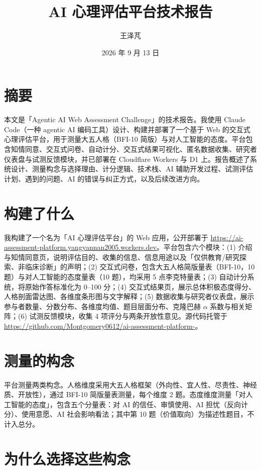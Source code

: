 \documentclass[11pt,a4paper]{ctexart}
\title{\bfseries AI 心理评估平台技术报告}
\author{王泽芃}
\date{2026 年 9 月 13 日}
\begin{document}
\maketitle

\section*{摘要}

本文是「Agentic AI Web Assessment Challenge」的技术报告。我使用 Claude Code（一种 agentic AI 编码工具）设计、构建并部署了一个基于 Web 的交互式心理评估平台，用于测量大五人格（BFI-10 简版）与对人工智能的态度。平台包含知情同意、交互式问卷、自动计分、交互式结果可视化、匿名数据收集、研究者仪表盘与试测反馈模块，并已部署在 Cloudflare Workers 与 D1 上。报告概述了系统设计、测量构念与选择理由、计分逻辑、技术栈、AI 辅助开发过程、试测评估计划、遇到的问题、AI 的错误与纠正方式，以及后续改进方向。

\section{构建了什么}

我构建了一个名为「AI 心理评估平台」的 Web 应用，公开部署于 \url{https://ai-assessment-platform.yangyannan2005.workers.dev}。平台包含六个模块：(1) 介绍与知情同意页，说明评估目的、收集的信息、信息用途以及「仅供教育/研究探索、非临床诊断」的声明；(2) 交互式问卷，包含大五人格简版量表（BFI-10，10 题）与对人工智能的态度量表（10 题），均采用 5 点李克特量表；(3) 自动计分系统，将原始作答标准化为 0--100 分；(4) 交互式结果页，展示总体积极态度得分、人格剖面雷达图、各维度条形图与文字解释；(5) 数据收集与研究者仪表盘，展示参与者数量、分数分布、各维度均值、题目层面分布、克隆巴赫 $\alpha$ 系数与相关矩阵；(6) 试测反馈模块，收集 4 项评分与两条开放性意见。源代码托管于 \url{https://github.com/Montgomery0612/ai-assessment-platform-}。

\section{测量的构念}

平台测量两类构念。人格维度采用大五人格框架（外向性、宜人性、尽责性、神经质、开放性），通过 BFI-10 简版量表测量，每个维度 2 题。态度维度测量「对人工智能的态度」，包含五个分量表：对 AI 的信任、审慎使用、AI 担忧（反向计分）、使用意愿、AI 社会影响看法；其中第 10 题（价值取向）为描述性题目，不计入总分。

\section{为什么选择这些构念}
\end{document}
